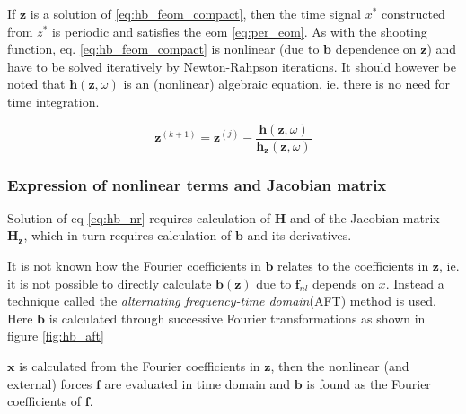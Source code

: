 If $\bm z$ is a solution of \eqref{eq:hb_feom_compact}, then the time signal $x^*$
constructed from $z^*$ is periodic and satisfies the eom \eqref{eq:per_eom}. As
with the shooting function, eq. \eqref{eq:hb_feom_compact} is nonlinear (due to
$\bm b$ dependence on $\bm z$) and have to be solved iteratively by
Newton-Rahpson iterations. It should however be noted that $\bm h(\bm z,
\omega)$ is an (nonlinear) algebraic equation, ie. there is no need for
time integration.

\begin{equation}
  \label{eq:hb_nr}
  \bm z^{(k+1)} = \bm z^{(j)} -
  \frac{\bm h(\bm z, \omega)}{\bm h_{\bm z}(\bm z, \omega)}
\end{equation}


\subsubsection{Expression of nonlinear terms and Jacobian matrix}
\label{sec:hb_exp_nonlin_jac}

Solution of eq \eqref{eq:hb_nr} requires calculation of $\bm H$ and of the
Jacobian matrix $\bm H_{\bm z}$, which in turn requires calculation of $\bm b$
and its derivatives.

It is not known how the Fourier coefficients in $\bm b$ relates to the
coefficients in $\bm z$, ie. it is not possible to directly calculate $\bm b(\bm
z)$ due to $\bm f_{nl}$ depends on $x$. Instead a technique called the
\textit{alternating frequency-time domain}(AFT) method is used. Here $\bm b$ is
calculated through successive Fourier transformations as shown in figure
\ref{fig:hb_aft}

\begin{center}
\label{fig:hb_aft}
\end{center}

$\bm x$ is calculated from the Fourier coefficients in $\bm z$, then the
nonlinear (and external) forces $\bm f$ are evaluated in time domain and $\bm b$
is found as the Fourier coefficients of $\bm f$.

